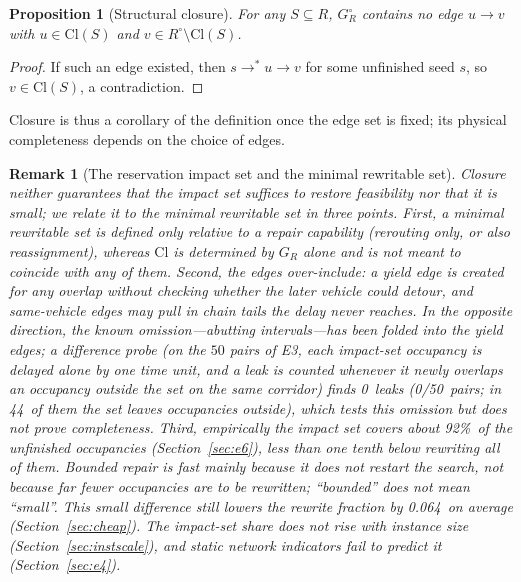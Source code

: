 \documentclass[manuscript,screen,review]{acmart}
\newcommand{\NPairs}{50}
\newcommand{\ClosureAliveFrac}{92\%}
\newcommand{\RAStabMean}{0.064}      %
\newcommand{\ProbeLeakPairs}{0/50}
\newcommand{\ProbeLeaks}{0}
\newcommand{\ProbeOutsidePairs}{44}  %
\newtheorem{remark}{Remark}
\newtheorem{prop}{Proposition}
\begin{document}
\begin{prop}[Structural closure]
\label{prop:struct}
For any \(S\subseteq R\), \(G_R^\circ\) contains no edge \(u\to v\) with \(u\in\mathrm{Cl}(S)\) and \(v\in R^{\circ}\setminus\mathrm{Cl}(S)\).
\end{prop}

\begin{proof}
If such an edge existed, then \(s\to^* u\to v\) for some unfinished seed \(s\), so \(v\in\mathrm{Cl}(S)\), a contradiction.
\end{proof}

Closure is thus a corollary of the definition once the edge set is fixed; its physical completeness depends on the choice of edges.

\begin{remark}[The reservation impact set and the minimal rewritable set]
\label{rem:minimality}
Closure neither guarantees that the impact set suffices to restore feasibility nor that it is small; we relate it to the minimal rewritable set in three points.
First, a \emph{minimal} rewritable set is defined only relative to a repair capability (rerouting only, or also reassignment), whereas \(\mathrm{Cl}\) is determined by \(G_R\) alone and is not meant to coincide with any of them.
Second, the edges over-include: a yield edge is created for any overlap without checking whether the later vehicle could detour, and same-vehicle edges may pull in chain tails the delay never reaches.
In the opposite direction, the known omission---abutting intervals---has been folded into the yield edges; a difference probe (on the \(\NPairs\) pairs of E3, each impact-set occupancy is delayed alone by one time unit, and a leak is counted whenever it newly overlaps an occupancy outside the set on the same corridor) finds \ProbeLeaks\ leaks (\ProbeLeakPairs\ pairs; in \ProbeOutsidePairs\ of them the set leaves occupancies outside), which tests this omission but does not prove completeness.
Third, empirically the impact set covers about \ClosureAliveFrac\ of the unfinished occupancies (Section~\ref{sec:e6}), less than one tenth below rewriting all of them.
Bounded repair is fast mainly because it does not restart the search, not because far fewer occupancies are to be rewritten; ``bounded'' does not mean ``small''.
This small difference still lowers the rewrite fraction by \RAStabMean\ on average (Section~\ref{sec:cheap}).
The impact-set share does not rise with instance size (Section~\ref{sec:instscale}), and static network indicators fail to predict it (Section~\ref{sec:e4}).
\end{remark}
\end{document}
